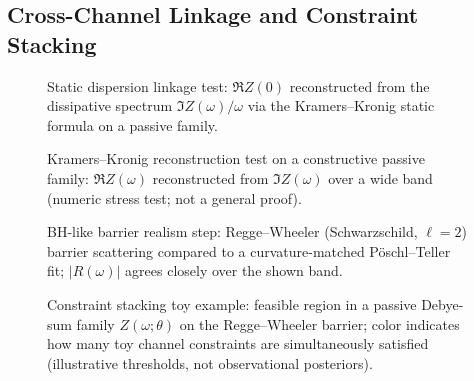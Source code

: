   \subsection{Cross-Channel Linkage and Constraint Stacking} \label{sec:bh-crosschannel}
    
    
    \begin{figure}[t]
      \centering
      \caption{Static dispersion linkage test: $\Re Z(0)$ reconstructed from the dissipative spectrum $\Im Z(\omega)/\omega$ via the Kramers--Kronig static formula on a passive family.}
      \label{fig:bh-cross-channel}
    \end{figure}
    \begin{figure}[t]
      \centering
      \caption{Kramers--Kronig reconstruction test on a constructive passive family: $\Re Z(\omega)$ reconstructed from $\Im Z(\omega)$ over a wide band (numeric stress test; not a general proof).}
      \label{fig:bh-kk}
    \end{figure}
    \begin{figure}[t]
      \centering
      \caption{BH-like barrier realism step: Regge--Wheeler (Schwarzschild, $\ell=2$) barrier scattering compared to a curvature-matched P\"oschl--Teller fit; $|R(\omega)|$ agrees closely over the shown band.}
      \label{fig:bh-rw-vs-pt}
    \end{figure}
    \begin{figure}[t]
      \centering
      \caption{Constraint stacking toy example: feasible region in a passive Debye-sum family $Z(\omega;\theta)$ on the Regge--Wheeler barrier; color indicates how many toy channel constraints are simultaneously satisfied (illustrative thresholds, not observational posteriors).}
      \label{fig:bh-constraint-stacking}
    \end{figure}
